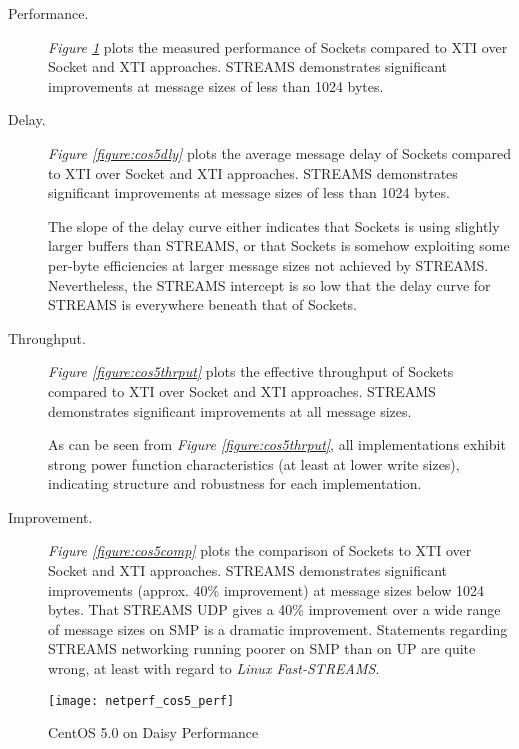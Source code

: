 \documentclass[letterpaper,final,notitlepage,twocolumn,10pt,twoside]{article}
\begin{document}
\begin{description}

\item[Performance.]

\textit{Figure \ref{figure:cos5perf}}
plots the measured performance of Sockets compared to XTI over Socket and XTI approaches.  STREAMS
demonstrates significant improvements at message sizes of less than 1024 bytes.

\item[Delay.]

\textit{Figure \ref{figure:cos5dly}}
plots the average message delay of Sockets compared to XTI over Socket and XTI approaches.  STREAMS
demonstrates significant improvements at message sizes of less than 1024 bytes.

The slope of the delay curve either indicates that Sockets is using slightly larger buffers than
STREAMS, or that Sockets is somehow exploiting some per-byte efficiencies at larger message sizes
not achieved by STREAMS.  Nevertheless, the STREAMS intercept is so low that the delay curve for
STREAMS is everywhere beneath that of Sockets.

\item[Throughput.]

\textit{Figure \ref{figure:cos5thrput}}
plots the effective throughput of Sockets compared to XTI over Socket and XTI approaches.  STREAMS
demonstrates significant improvements at all message sizes.

As can be seen from \textit{Figure \ref{figure:cos5thrput}}, all implementations exhibit strong
power function characteristics (at least at lower write sizes), indicating structure and robustness
for each implementation.

\item[Improvement.]

\textit{Figure \ref{figure:cos5comp}}
plots the comparison of Sockets to XTI over Socket and XTI approaches.  STREAMS demonstrates
significant improvements (approx. 40\% improvement) at message sizes below 1024 bytes.  That STREAMS
UDP gives a 40\% improvement over a wide range of message sizes on SMP is a dramatic improvement.
Statements regarding STREAMS networking running poorer on SMP than on UP are quite wrong, at least
with regard to \textsl{Linux Fast-STREAMS}.

\end{description}

\begin{figure}[p]
\center\texttt{[image: netperf\_cos5\_perf]}
\caption[CentOS 5.0 on Daisy Performance]{CentOS 5.0 on Daisy Performance}
\label{figure:cos5perf}
\end{figure}
\end{document}
